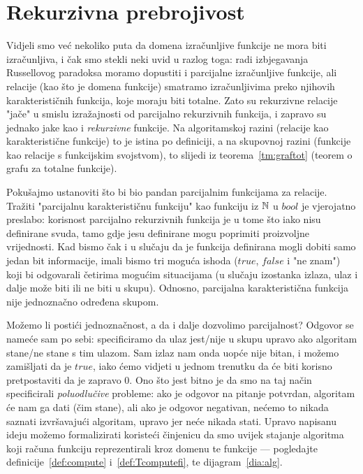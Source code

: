 \chapter{Rekurzivna prebrojivost}\label{ch:re}


Vidjeli smo već nekoliko puta da domena izračunljive funkcije ne mora biti izračunljiva, i čak smo stekli neki uvid u razlog toga: radi izbjegavanja Russellovog paradoksa moramo dopustiti i parcijalne izračunljive funkcije, ali relacije (kao što je domena funkcije) smatramo izračunljivima preko njihovih karakterističnih funkcija, koje moraju biti totalne. Zato su rekurzivne relacije "jače" u smislu izražajnosti od parcijalno rekurzivnih funkcija, i zapravo su jednako jake kao i \emph{rekurzivne} funkcije. Na algoritamskoj razini (relacije kao karakteristične funkcije) to je istina po definiciji, a na skupovnoj razini (funkcije kao relacije s funkcijskim svojstvom), to slijedi iz teorema~\ref{tm:graftot} (teorem o grafu za totalne funkcije).

Pokušajmo ustanoviti što bi bio pandan parcijalnim funkcijama za relacije. Tražiti "parcijalnu karakterističnu funkciju" kao funkciju iz ${\mathbb N}$ u $bool$ je vjerojatno preslabo: korisnost parcijalno rekurzivnih funkcija je u tome što iako nisu definirane svuda, tamo gdje jesu definirane mogu poprimiti proizvoljne vrijednosti. Kad bismo čak i u slučaju da je funkcija definirana mogli dobiti samo jedan bit informacije, imali bismo tri moguća ishoda ($\mathit{true}$, $\mathit{false}$ i "ne znam") koji bi odgovarali četirima mogućim situacijama (u slučaju izostanka izlaza, ulaz i dalje može biti ili ne biti u skupu). Odnosno, parcijalna karakteristična funkcija nije jednoznačno određena skupom.

Možemo li postići jednoznačnost, a da i dalje dozvolimo parcijalnost? Odgovor se nameće sam po sebi: specificiramo da ulaz jest\slash nije u skupu upravo ako algoritam stane\slash ne stane s tim ulazom. Sam izlaz nam onda uopće nije bitan, i možemo zamišljati da je $\mathit{true}$, iako ćemo vidjeti u jednom trenutku da će biti korisno pretpostaviti da je zapravo $0$. Ono što jest bitno je da smo na taj način specificirali \emph{poluodlučive} probleme: ako je odgovor na pitanje potvrdan, algoritam će nam ga dati (čim stane), ali ako je odgovor negativan, nećemo to nikada saznati izvršavajući algoritam, upravo jer neće nikada stati. Upravo napisanu ideju možemo formalizirati koristeći činjenicu da smo uvijek stajanje algoritma koji računa funkciju reprezentirali kroz domenu te funkcije --- pogledajte definicije~\ref{def:compute} i~\ref{def:Tcomputefi}, te dijagram~\eqref{dia:alg}.

